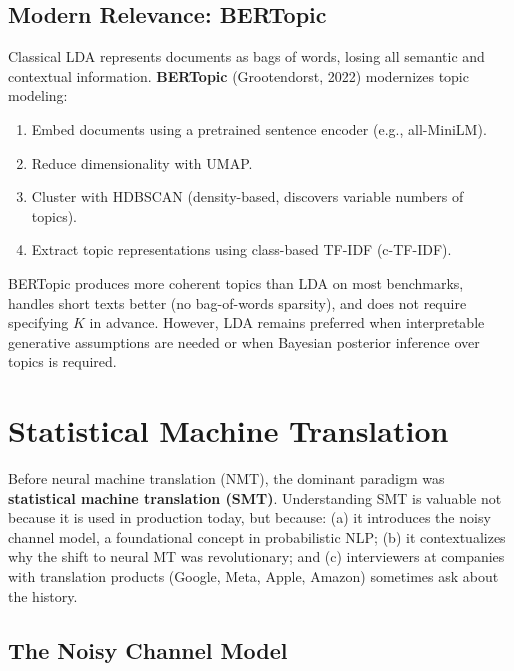 \subsection{Modern Relevance: BERTopic}

Classical LDA represents documents as bags of words, losing all semantic and
contextual information.  \textbf{BERTopic} (Grootendorst, 2022) modernizes
topic modeling:

\begin{enumerate}
    \item Embed documents using a pretrained sentence encoder (e.g., all-MiniLM).
    \item Reduce dimensionality with UMAP.
    \item Cluster with HDBSCAN (density-based, discovers variable numbers of topics).
    \item Extract topic representations using class-based TF-IDF (c-TF-IDF).
\end{enumerate}

BERTopic produces more coherent topics than LDA on most benchmarks, handles
short texts better (no bag-of-words sparsity), and does not require specifying
$K$ in advance.  However, LDA remains preferred when interpretable generative
assumptions are needed or when Bayesian posterior inference over topics is
required.


\section{Statistical Machine Translation}
\label{sec:smt}

Before neural machine translation (NMT), the dominant paradigm was
\textbf{statistical machine translation (SMT)}.  Understanding SMT is
valuable not because it is used in production today, but because:
(a) it introduces the noisy channel model, a foundational concept in
probabilistic NLP; (b) it contextualizes why the shift to neural MT was
revolutionary; and (c) interviewers at companies with translation products
(Google, Meta, Apple, Amazon) sometimes ask about the history.

\subsection{The Noisy Channel Model}

